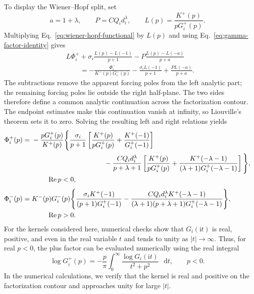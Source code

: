 \documentclass[pdflatex,onecolumn,sn-mathphys-ay]{sn-jnl}
\newcommand{\dd}{\mathop{}\!\mathrm{d}}
\newcommand{\ii}{\mathrm{i}}
\begin{document}
To display the Wiener--Hopf split, set
\begin{equation*}
  a=1+\lambda,\qquad
  P=CQ_i d_i^\lambda,\qquad
  L(p)=\frac{K^+(p)}{pG_i^+(p)}.
\end{equation*}
Multiplying Eq.~\eqref{eq:wiener-hopf-functional} by $L(p)$ and using
Eq.~\eqref{eq:gamma-factor-identity} gives
\begin{equation*}
\begin{aligned}
  &L\Phi_i^+
  +\sigma_i\frac{L(p)-L(-1)}{p+1}
  -P\frac{L(p)-L(-a)}{p+a}\\
  &\qquad=
  -\frac{\Phi_i^-}{K^-(p)G_i^-(p)}
  -\frac{\sigma_iL(-1)}{p+1}
  +\frac{PL(-a)}{p+a}.
\end{aligned}
\end{equation*}
The subtractions remove the apparent forcing poles from the left analytic
part; the remaining forcing poles lie outside the right half-plane.
The two sides therefore define a common analytic continuation across the
factorization contour. The endpoint estimates make this continuation vanish
at infinity, so Liouville's theorem sets it to zero. Solving the
resulting left and right relations yields
\begin{equation}
\label{eq:wiener-hopf-solution}
\begin{aligned}
  \Phi_i^+(p)={}&
  -\frac{pG_i^+(p)}{K^+(p)}
  \Bigg\{
    \frac{\sigma_i}{p+1}
    \left[
      \frac{K^+(p)}{pG_i^+(p)}
      +\frac{K^+(-1)}{G_i^+(-1)}
    \right]\\
  &\hspace{37mm}
    -\frac{CQ_i d_i^\lambda}{p+\lambda+1}
    \left[
      \frac{K^+(p)}{pG_i^+(p)}
      +\frac{K^+(-\lambda-1)}
      {(\lambda+1)G_i^+(-\lambda-1)}
    \right]
  \Bigg\},\\[-1pt]
  &\hspace{8mm}\operatorname{Re}p<0,\\[3pt]
  \Phi_i^-(p)={}&
  K^-(p)G_i^-(p)
  \Bigg\{
    \frac{\sigma_iK^+(-1)}{(p+1)G_i^+(-1)}
    -\frac{CQ_i d_i^\lambda K^+(-\lambda-1)}
    {(\lambda+1)(p+\lambda+1)G_i^+(-\lambda-1)}
  \Bigg\},\\[-1pt]
  &\hspace{8mm}\operatorname{Re}p>0.
\end{aligned}
\end{equation}
For the kernels considered here, numerical checks show that
$G_i(\ii t)$ is real, positive, and even in the real variable $t$ and
tends to unity as $|t|\to\infty$.
Thus, for real $p<0$, the plus factor can be evaluated numerically
using the real integral
\begin{equation*}
  \log G_i^+(p)
  =-\frac{p}{\pi}\int_0^\infty
    \frac{\log G_i(\ii t)}{t^2+p^2}\,\dd t,
  \qquad p<0.
\end{equation*}
In the numerical calculations, we verify that the kernel is real and
positive on the factorization contour and approaches unity for large
$|t|$.
\end{document}
